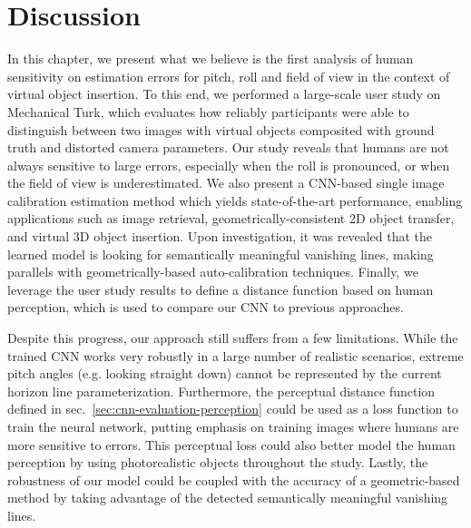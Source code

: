 
\section{Discussion}

In this chapter, we present what we believe is the first analysis of human sensitivity on estimation errors for pitch, roll and field of view in the context of virtual object insertion. To this end, we performed a large-scale user study on Mechanical Turk, which evaluates how reliably participants were able to distinguish between two images with virtual objects composited with ground truth and distorted camera parameters.
Our study reveals that humans are not always sensitive to large errors, especially when the roll is pronounced, or when the field of view is underestimated. We also present a CNN-based single image calibration estimation method which yields state-of-the-art performance, enabling applications such as image retrieval, geometrically-consistent 2D object transfer, and virtual 3D object insertion. Upon investigation, it was revealed that the learned model is looking for semantically meaningful vanishing lines, making parallels with geometrically-based auto-calibration techniques. Finally, we leverage the user study results to define a distance function based on human perception, which is used to compare our CNN to previous approaches.

Despite this progress, our approach still suffers from a few limitations. While the trained CNN works very robustly in a large number of realistic scenarios, extreme pitch angles (e.g. looking straight down) cannot be represented by the current horizon line parameterization. Furthermore, the perceptual distance function defined in sec.~\ref{sec:cnn-evaluation-perception} could be used as a loss function to train the neural network, putting emphasis on training images where humans are more sensitive to errors. This perceptual loss could also better model the human perception by using photorealistic objects throughout the study. Lastly, the robustness of our model could be coupled with the accuracy of a geometric-based method by taking advantage of the detected semantically meaningful vanishing lines.
